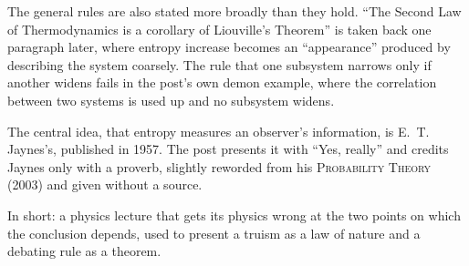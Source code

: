 \begin{afterword}
The general rules are also stated more broadly than they hold. ``The Second Law of Thermodynamics is a corollary of Liouville's Theorem'' is taken back one paragraph later, where entropy increase becomes an ``appearance'' produced by describing the system coarsely. The rule that one subsystem narrows only if another widens fails in the post's own demon example, where the correlation between two systems is used up and no subsystem widens.

The central idea, that entropy measures an observer's information, is E.~T. Jaynes's, published in 1957. The post presents it with ``Yes, really'' and credits Jaynes only with a proverb, slightly reworded from his \textsc{Probability Theory} (2003) and given without a source.

In short: a physics lecture that gets its physics wrong at the two points on which the conclusion depends, used to present a truism as a law of nature and a debating rule as a theorem.
\end{afterword}
